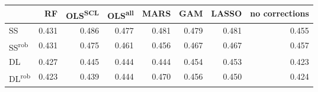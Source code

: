 \begin{tabular}{lrrrrrrr}
\toprule
 & RF & OLS\textsuperscript{SCL} & OLS\textsuperscript{all} & MARS & GAM & LASSO & no corrections \\
\midrule
SS & {\cellcolor[HTML]{D2D2D2}} \color[HTML]{000000} 0.431 & {\cellcolor[HTML]{000000}} \color[HTML]{F1F1F1} 0.486 & {\cellcolor[HTML]{222222}} \color[HTML]{F1F1F1} 0.477 & {\cellcolor[HTML]{131313}} \color[HTML]{F1F1F1} 0.481 & {\cellcolor[HTML]{1A1A1A}} \color[HTML]{F1F1F1} 0.479 & {\cellcolor[HTML]{131313}} \color[HTML]{F1F1F1} 0.481 & {\cellcolor[HTML]{767676}} \color[HTML]{F1F1F1} 0.455 \\
SS\textsuperscript{rob} & {\cellcolor[HTML]{D2D2D2}} \color[HTML]{000000} 0.431 & {\cellcolor[HTML]{2A2A2A}} \color[HTML]{F1F1F1} 0.475 & {\cellcolor[HTML]{5F5F5F}} \color[HTML]{F1F1F1} 0.461 & {\cellcolor[HTML]{727272}} \color[HTML]{F1F1F1} 0.456 & {\cellcolor[HTML]{494949}} \color[HTML]{F1F1F1} 0.467 & {\cellcolor[HTML]{494949}} \color[HTML]{F1F1F1} 0.467 & {\cellcolor[HTML]{6E6E6E}} \color[HTML]{F1F1F1} 0.457 \\
DL & {\cellcolor[HTML]{E1E1E1}} \color[HTML]{000000} 0.427 & {\cellcolor[HTML]{9D9D9D}} \color[HTML]{F1F1F1} 0.445 & {\cellcolor[HTML]{A0A0A0}} \color[HTML]{F1F1F1} 0.444 & {\cellcolor[HTML]{A0A0A0}} \color[HTML]{F1F1F1} 0.444 & {\cellcolor[HTML]{7B7B7B}} \color[HTML]{F1F1F1} 0.454 & {\cellcolor[HTML]{7E7E7E}} \color[HTML]{F1F1F1} 0.453 & {\cellcolor[HTML]{F1F1F1}} \color[HTML]{000000} 0.423 \\
DL\textsuperscript{rob} & {\cellcolor[HTML]{F1F1F1}} \color[HTML]{000000} 0.423 & {\cellcolor[HTML]{B3B3B3}} \color[HTML]{000000} 0.439 & {\cellcolor[HTML]{A0A0A0}} \color[HTML]{F1F1F1} 0.444 & {\cellcolor[HTML]{3D3D3D}} \color[HTML]{F1F1F1} 0.470 & {\cellcolor[HTML]{727272}} \color[HTML]{F1F1F1} 0.456 & {\cellcolor[HTML]{8A8A8A}} \color[HTML]{F1F1F1} 0.450 & {\cellcolor[HTML]{EDEDED}} \color[HTML]{000000} 0.424 \\
\bottomrule
\end{tabular}
